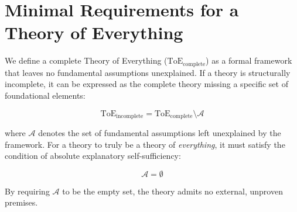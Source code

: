 
\section{Minimal Requirements for a Theory of Everything}
\label{sect:minimal-requirements}

We define a complete Theory of Everything ($\text{ToE}_{\text{complete}}$) as a formal framework that leaves no fundamental assumptions unexplained.
If a theory is structurally incomplete, it can be expressed as the complete theory missing a specific set of foundational elements:

\[
\text{ToE}_{\text{incomplete}} = \text{ToE}_{\text{complete}} \setminus \mathcal{A}
\]

where $\mathcal{A}$ denotes the set of fundamental assumptions left unexplained by the framework.
For a theory to truly be a theory of \textit{everything}, it must satisfy the condition of absolute explanatory self-sufficiency:

\[
\mathcal{A} = \emptyset
\]

By requiring $\mathcal{A}$ to be the empty set, the theory admits no external, unproven premises. 

